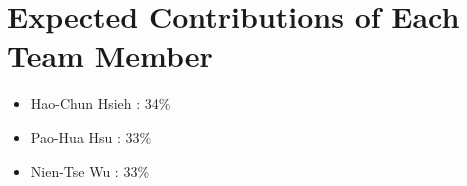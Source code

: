 \section{Expected Contributions of Each Team Member}
\begin{itemize}
    \item Hao-Chun Hsieh    : 34\%
    \item Pao-Hua Hsu       : 33\%
    \item Nien-Tse Wu      : 33\%
\end{itemize}

